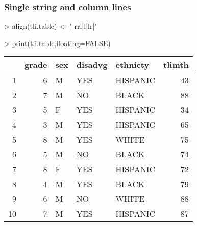 \documentclass[letterpaper]{article}
\begin{document}
\subsubsection{Single string and column lines}
\begin{Schunk}
\begin{Sinput}
> align(tli.table) <- "|rrl|l|lr|"
\end{Sinput}
\end{Schunk}
\begin{Schunk}
\begin{Sinput}
> print(tli.table,floating=FALSE)
\end{Sinput}
% latex table generated in R 3.1.1 by xtable 1.7-3 package
% 
\begin{tabular}{|rrl|l|lr|}
  \hline
 & grade & sex & disadvg & ethnicty & tlimth \\ 
  \hline
1 &   6 & M & YES & HISPANIC &  43 \\ 
  2 &   7 & M & NO & BLACK &  88 \\ 
  3 &   5 & F & YES & HISPANIC &  34 \\ 
  4 &   3 & M & YES & HISPANIC &  65 \\ 
  5 &   8 & M & YES & WHITE &  75 \\ 
  6 &   5 & M & NO & BLACK &  74 \\ 
  7 &   8 & F & YES & HISPANIC &  72 \\ 
  8 &   4 & M & YES & BLACK &  79 \\ 
  9 &   6 & M & NO & WHITE &  88 \\ 
  10 &   7 & M & YES & HISPANIC &  87 \\ 
   \hline
\end{tabular}\end{Schunk}
\end{document}
